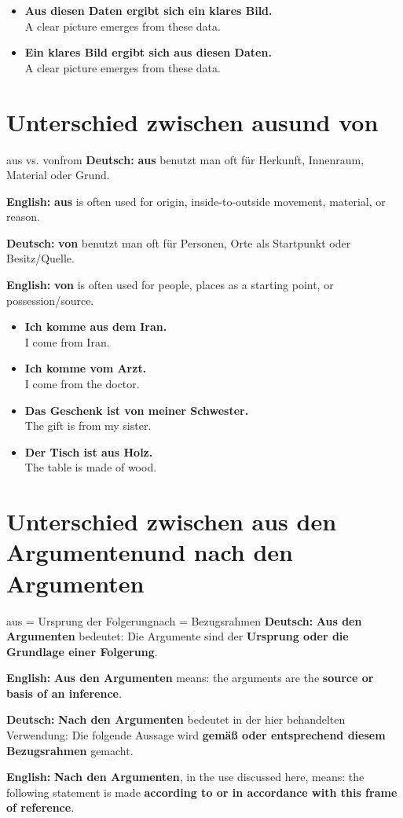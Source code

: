 \documentclass[a4paper,11pt]{article}
\newcommand{\GermanText}[1]{\textbf{Deutsch: }#1\par}
\newcommand{\EnglishText}[1]{{\small\color{SoftGray}\textbf{English: }#1\par}}
\newcommand{\ExampleItem}[2]{\item \textbf{#1}\\{\small\color{SoftGray}#2}}
\begin{document}
\begin{exbox}
\begin{itemize}
\ExampleItem{Aus diesen Daten ergibt sich ein klares Bild.}{A clear picture emerges from these data.}
\ExampleItem{Ein klares Bild ergibt sich aus diesen Daten.}{A clear picture emerges from these data.}
\end{itemize}
\end{exbox}

\section{Unterschied zwischen \glqq aus\grqq und \glqq von\grqq}

\begin{grammarentry}{aus vs. von}{from}
\GermanText{\textbf{aus} benutzt man oft für Herkunft, Innenraum, Material oder Grund.}
\EnglishText{\textbf{aus} is often used for origin, inside-to-outside movement, material, or reason.}

\GermanText{\textbf{von} benutzt man oft für Personen, Orte als Startpunkt oder Besitz/Quelle.}
\EnglishText{\textbf{von} is often used for people, places as a starting point, or possession/source.}
\end{grammarentry}

\begin{exbox}
\begin{itemize}
\ExampleItem{Ich komme aus dem Iran.}{I come from Iran.}
\ExampleItem{Ich komme vom Arzt.}{I come from the doctor.}
\ExampleItem{Das Geschenk ist von meiner Schwester.}{The gift is from my sister.}
\ExampleItem{Der Tisch ist aus Holz.}{The table is made of wood.}
\end{itemize}
\end{exbox}

\section{Unterschied zwischen \glqq aus den Argumenten\grqq und \glqq nach den Argumenten\grqq}

\begin{grammarentry}{aus = Ursprung der Folgerung}{nach = Bezugsrahmen}
\GermanText{\textbf{Aus den Argumenten} bedeutet: Die Argumente sind der \textbf{Ursprung oder die Grundlage einer Folgerung}.}
\EnglishText{\textbf{Aus den Argumenten} means: the arguments are the \textbf{source or basis of an inference}.}

\GermanText{\textbf{Nach den Argumenten} bedeutet in der hier behandelten Verwendung: Die folgende Aussage wird \textbf{gemäß oder entsprechend diesem Bezugsrahmen} gemacht.}
\EnglishText{\textbf{Nach den Argumenten}, in the use discussed here, means: the following statement is made \textbf{according to or in accordance with this frame of reference}.}
\end{grammarentry}
\end{document}
